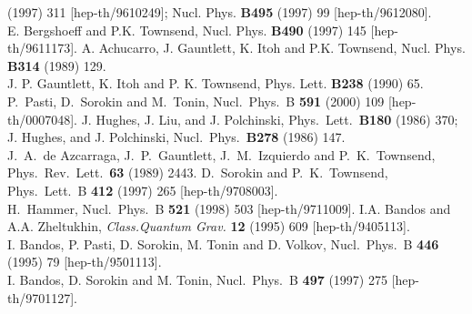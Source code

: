 \documentclass[a4paper,12pt]{article}
\begin{document}
\begin{thebibliography}{999}
(1997) 311 [hep-th/9610249]; Nucl. Phys. {\bf B495} (1997) 99
[hep-th/9612080].\\
E. Bergshoeff and P.K. Townsend, Nucl. Phys.
{\bf B490} (1997) 145 [hep-th/9611173].
A. Achucarro, J. Gauntlett, K. Itoh and P.K. Townsend, {Nucl.
Phys.} {\bf B314} (1989) 129.\\
J. P. Gauntlett, K. Itoh and P. K. Townsend, {Phys. Lett.}
{\bf B238} (1990) 65.
P.~Pasti, D.~Sorokin and M.~Tonin,
Nucl.\ Phys.\ B {\bf 591} (2000) 109 [hep-th/0007048].
J. Hughes, J. Liu, and J. Polchinski,  Phys.\ Lett.\
{\bf B180} (1986) 370;
J. Hughes, and J. Polchinski, Nucl.\ Phys.\
{\bf B278} (1986) 147.\\
J.~A.~de Azcarraga, J.~P.~Gauntlett, J.~M.~Izquierdo and
P.~K.~Townsend,
Phys.\ Rev.\ Lett.\  {\bf 63} (1989) 2443.
\bibitem{Sorokin:1997ps}
D.~Sorokin and P.~K.~Townsend,
Phys.\ Lett.\ B {\bf 412} (1997) 265 [hep-th/9708003].
\\
H.~Hammer,
Nucl.\ Phys.\ B {\bf 521} (1998) 503 [hep-th/9711009].
\bibitem{harm}
 I.A. Bandos and A.A. Zheltukhin,
     {\em Class.Quantum Grav.} {\bf 12} (1995) 609
[hep-th/9405113].\\
I. Bandos, P. Pasti, D. Sorokin, M. Tonin and D. Volkov,
 {Nucl.\ Phys.}\ B {\bf 446} (1995) 79 [hep-th/9501113].
 \\
I. Bandos, D. Sorokin and M. Tonin, {Nucl.\ Phys.}\ B {\bf 497}
(1997) 275 [hep-th/9701127].


\end{thebibliography}
\end{document}
